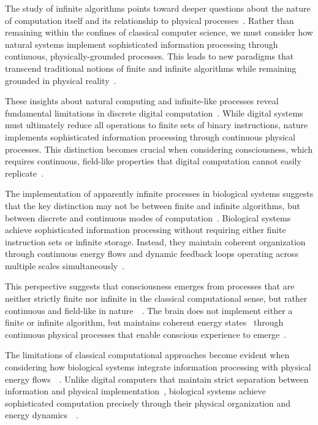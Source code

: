 The study of infinite algorithms points toward deeper questions about the nature of computation itself and its relationship to physical processes~\cite{Hamkins2014,seth2021being,nagel1980like}. Rather than remaining within the confines of classical computer science, we must consider how natural systems implement sophisticated information processing through continuous, physically-grounded processes. This leads to new paradigms that transcend traditional notions of finite and infinite algorithms while remaining grounded in physical reality~\cite{Sipser2012,da2024mathematical}.

These insights about natural computing and infinite-like processes reveal fundamental limitations in discrete digital computation~\cite{Wegner2003,zheng2025unbearable,van2025processes}. While digital systems must ultimately reduce all operations to finite sets of binary instructions, nature implements sophisticated information processing through continuous physical processes. This distinction becomes crucial when considering consciousness, which requires continuous, field-like properties that digital computation cannot easily replicate~\cite{PourEl1989,haier1988cortical,Polsky2004}.

The implementation of apparently infinite processes in biological systems suggests that the key distinction may not be between finite and infinite algorithms, but between discrete and continuous modes of computation~\cite{Goldin2006,Smith2013,TranVanMinh2015}. Biological systems achieve sophisticated information processing without requiring either finite instruction sets or infinite storage. Instead, they maintain coherent organization through continuous energy flows and dynamic feedback loops operating across multiple scales simultaneously~\cite{Floyd2014,London2005,Gidon2020}.

This perspective suggests that consciousness emerges from processes that are neither strictly finite nor infinite in the classical computational sense, but rather continuous and field-like in nature~~\cite{Barendregt1984,Larkum2022b,thompson2010mind}. The brain does not implement either a finite or infinite algorithm, but maintains coherent energy states~ through continuous physical processes that enable conscious experience to emerge~\cite{Boolos2007,Stuart2015,pockett2012electromagnetic}.

The limitations of classical computational approaches become evident when considering how biological systems integrate information processing with physical energy flows~~\cite{Kozen2006,Thompson2001,Michalikova2019}. Unlike digital computers that maintain strict separation between information and physical implementation~, biological systems achieve sophisticated computation precisely through their physical organization and energy dynamics~~\cite{Mancosu2008,bullmore2012economy,amil2024theta}.

